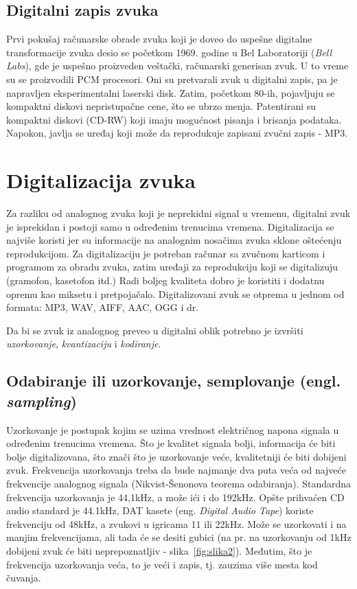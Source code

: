 \documentclass[a4paper]{article}
\begin{document}
    \subsection {Digitalni zapis zvuka}
    Prvi pokušaj računarske obrade zvuka koji je doveo do uspešne digitalne
    transformacije zvuka desio se početkom 1969. godine u Bel Laboratoriji (\textit {Bell
    Labs}), gde je uspešno proizveden veštački, računarski generisan zvuk. U to vreme su se proizvodili PCM procesori. Oni su pretvarali zvuk u digitalni zapis, pa je napravljen eksperimentalni laserski disk. Zatim, početkom 80-ih, pojavljuju se kompaktni diskovi nepristupačne cene, što se ubrzo menja. Patentirani su kompaktni diskovi (CD-RW) koji imaju mogućnost pisanja i brisanja podataka. Napokon, javlja se uređaj koji može da reprodukuje zapisani zvučni zapis - MP3.

    \section{Digitalizacija zvuka}
    Za razliku od analognog zvuka koji je neprekidni signal u vremenu, digitalni zvuk je isprekidan i postoji samo u određenim trenucima vremena. Digitalizacija se najviše koristi jer su informacije na analognim nosačima zvuka sklone oštećenju reprodukcijom. Za digitalizaciju je potreban računar sa zvučnom karticom i programom za obradu zvuka, zatim uređaji za reprodukciju koji se digitalizuju (gramofon, kasetofon itd.) Radi boljeg kvaliteta dobro je koristiti i dodatnu opremu kao miksetu i pretpojačalo\cite{jurkovic2021digitalizacija}. Digitalizovani zvuk se otprema u jednom od formata: MP3, WAV, AIFF, AAC, OGG i dr.
    
    Da bi se zvuk iz analognog preveo u digitalni oblik potrebno je izvršiti \textit{uzorkovanje}, \textit{kvantizaciju} i \textit{kodiranje}.
    
    \subsection{Odabiranje ili uzorkovanje, semplovanje (engl. \textit{sampling})}
    Uzorkovanje je postupak kojim se uzima vrednost električnog napona signala u određenim trenucima vremena. Što je kvalitet signala bolji, informacija će biti bolje digitalizovana, što znači što je uzorkovanje veće, kvalitetniji će biti dobijeni zvuk. Frekvencija uzorkovanja treba da bude najmanje dva puta veća od najveće frekvencije analognog signala (Nikvist-Šenonova teorema odabiranja). Standardna frekvencija uzorkovanja je 44,1kHz, a može ići i do 192kHz. Opšte prihvaćen CD audio standard je 44.1kHz, DAT kasete (eng. \textit{Digital Audio Tape}) koriste frekvenciju od 48kHz, a zvukovi u igricama 11 ili 22kHz. Može se uzorkovati i na manjim frekvencijama, ali tada će se desiti gubici (na pr. na uzorkovanju od 1kHz dobijeni zvuk će biti neprepoznatljiv - slika~\ref{fig:slika2}). Međutim, što je frekvencija uzorkovanja veća, to je veći i zapis, tj. zauzima više mesta kod čuvanja\cite{jurkovic2021digitalizacija}.
    
\end{document}
